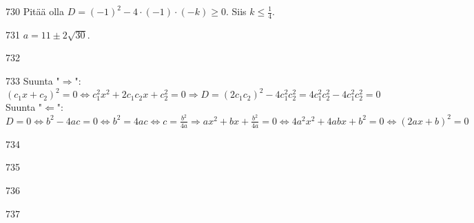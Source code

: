 \begin{Vastaus}{730}
		Pitää olla $D=(-1)^2-4 \cdot (-1) \cdot (-k) \geq 0$. Siis $k \leq \frac{1}{4}$.
	
\end{Vastaus}
\begin{Vastaus}{731}
		$a =11 \pm 2\sqrt{30}$.
	
\end{Vastaus}
\begin{Vastaus}{732}
	
\end{Vastaus}
\begin{Vastaus}{733}
		Suunta "$\Rightarrow$": $(c_1 x+ c_2)^2=0 \Leftrightarrow c_1^2 x^2 + 2c_1 c_2 x+ c_2^2 =0 \Rightarrow
		D=(2 c_1 c_2)^2-4 c_1^2 c_2^2 =4 c_1^2 c_2^2 -4 c_1^2 c_2^2 =0$ \\
		Suunta "$\Leftarrow$": $D=0 \Leftrightarrow b^2-4ac=0 \Leftrightarrow b^2=4ac \Leftrightarrow c=\frac{b^2}{4a} \Rightarrow ax^2+bx+\frac{b^2}{4a}=0 \Leftrightarrow 4a^2x^2+4abx+b^2=0 \Leftrightarrow (2ax+b)^2=0$
	
\end{Vastaus}
\begin{Vastaus}{734}
    
\end{Vastaus}
\begin{Vastaus}{735}
    
\end{Vastaus}
\begin{Vastaus}{736}
    
\end{Vastaus}
\begin{Vastaus}{737}
  
\end{Vastaus}
